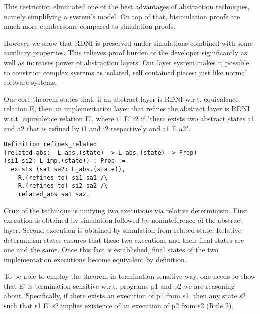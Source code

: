 This restriction eliminated one of the best advantages of abstraction techniques, namely simplifying a system's model.
On top of that, bisimulation proofs are much more cumbersome compared to simulation proofs. 

However we show that RDNI is preserved under simulations combined with some auxiliary properties. This relieves proof burden of the developer significantly as well as increases power of abstraction layers. Our layer system makes it possible to construct complex systems as isolated, self contained pieces; just like normal software systems.

Our core theorem states that, if an abstract layer is RDNI w.r.t. equivalence relation E, then an implementation layer that refines the abstract layer is RDNI w.r.t. equivalence relation E', where i1 E' i2 if "there exists two abstract states a1 and a2 that is refined by i1 and i2 respectively and a1 E a2".  

\begin{lstlisting}
Definition refines_related 
(related_abs:  L_abs.(state) -> L_abs.(state) -> Prop)
(si1 si2: L_imp.(state)) : Prop :=
  exists (sa1 sa2: L_abs.(state)),
    R.(refines_to) si1 sa1 /\
    R.(refines_to) si2 sa2 /\
    related_abs sa1 sa2.
\end{lstlisting}



Crux of the technique is unifying two executions via relative determinism. First execution is obtained by simulation followed by noninteference of the abstract layer. Second execution is obtained by simulation from related state. Relative determinism states ensures that these two executions and their final states are one and the same. Once this fact is established, final states of the two implementation executions become equivalent by definition.

To be able to employ the theorem in termination-sensitive way, one needs to show that E' is termination sensitive w.r.t. programs p1 and p2 we are reasoning about. Specifically, if there exists an execution of p1 from s1, then any state s2 such that s1 E' s2 implies existence of an execution of p2 from s2 (Rule 2). \\

